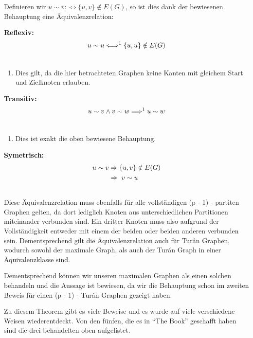 \documentclass[12pt, a4paper]{article}
\begin{document}
Definieren wir $u \sim v :\Longleftrightarrow \{ u,v \} \notin E(G)$, so ist dies dank der bewiesenen Behauptung eine Äquivalenzrelation:

\textbf{Reflexiv:}
\begin{gather}
\begin{split}u \sim u \Longleftrightarrow^1 \{ u,u \} \notin E(G)\end{split}\notag\\\begin{split}\end{split}\notag
\end{gather}\begin{enumerate}
\item {} 
Dies gilt, da die hier betrachteten Graphen keine Kanten mit gleichem Start und Zielknoten erlauben.

\end{enumerate}

\textbf{Transitiv:}
\begin{gather}
\begin{split}u \sim v \wedge v \sim w \Longrightarrow^1 u \sim w\end{split}\notag\\\begin{split}\end{split}\notag
\end{gather}\begin{enumerate}
\item {} 
Dies ist exakt die oben bewiesene Behauptung.

\end{enumerate}

\textbf{Symetrisch:}
\begin{gather}
\begin{split}u \sim v &\Rightarrow \{ u,v \} \notin E(G) \\
&\Rightarrow\ v \sim u\end{split}\notag\\\begin{split}\end{split}\notag
\end{gather}
Diese Äquivalenzrelation muss ebenfalls für alle vollständigen (p - 1) - partiten Graphen gelten, da dort lediglich Knoten aus unterschiedlichen Partitionen miteinander verbunden sind. Ein dritter Knoten muss also aufgrund der Vollständigkeit entweder mit einem der beiden oder beiden anderen verbunden sein. Dementsprechend gilt die Äquivalenzrelation auch für Turán Graphen, wodurch sowohl der maximale Graph, als auch der Turán Graph in einer Äquivalenzklasse sind.

Dementsprechend können wir unseren maximalen Graphen als einen solchen behandeln und die Aussage ist bewiesen, da wir die Behauptung schon im zweiten Beweis für einen (p - 1) - Turán Graphen gezeigt haben.

Zu diesem Theorem gibt es viele Beweise und es wurde auf viele verschiedene Weisen wiederentdeckt. Von den fünfen, die es in ``The Book'' geschafft haben sind die drei behandelten oben aufgelistet.
\end{document}
